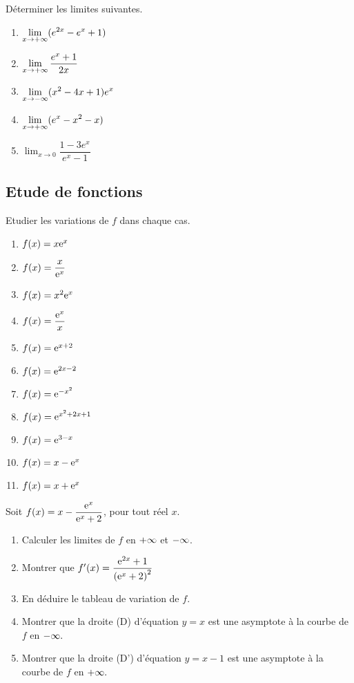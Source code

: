  
 \begin{exercice}
 
 Déterminer les limites suivantes.

 \begin{enumerate}
 \item   $ \displaystyle\lim_{x \to +\infty} (e^{2x}-e^{x} +1) $ \item   $\displaystyle \lim_{x \to +\infty} \dfrac{e^{x}+1}{2x} $  \item  $ \displaystyle\lim_{x \to -\infty}( x^{2}-4x +1)e^{x} $  \item  $\displaystyle \lim_{x \to +\infty}(e^{x}  -x^{2}-x) $ \item  $\displaystyle \lim_{x \to 0} \dfrac{1-3e^{x}}{e^{x}-1} $
 \end{enumerate}

 \end{exercice}
  \subsection*{Etude de fonctions}
  \begin{exercice}

 Etudier les variations de $ f $  dans chaque cas.
 
\begin{enumerate}
\item $ f(x)=x\mathrm{e}^{x} $ 
\item $ f(x)=\dfrac{x}{\mathrm{e}^{x}} $
\item $ f(x)=x^{2}\mathrm{e}^{x}$   
\item $f(x)= \dfrac{\mathrm{e}^{x}}{x} $  
\item $f(x)= \mathrm{e}^{x+2}$ 
\item $f(x)= \mathrm{e}^{2x-2} $   
\item  $f(x)=  \mathrm{e}^{-x^{2}} $
\item  $f(x)=  \mathrm{e}^{x^{2}+2x+1} $   
 \item $ f(x)= \mathrm{e}^{3-x}$ 
  \item $ f(x)= x-\mathrm{e}^{x}$ 
  \item $ f(x)= x+\mathrm{e}^{x}$ 
\end{enumerate}

 \end{exercice}
 
 \begin{exercice}
  Soit $ f(x)=x-\dfrac{\mathrm{e}^{x}}{\mathrm{e}^{x}+2} $,\; pour tout réel $ x. $
  \begin{enumerate}
  \item Calculer  les limites de $ f $  en $+\infty $ et $ -\infty$.
  \item Montrer que $ f^{\prime} (x)=\dfrac{\mathrm{e}^{2x}+1}{\left(\mathrm{e}^{x}+2\right)^{2}}$
  \item En déduire le tableau de variation de $ f. $
  \item Montrer que la droite (D) d'équation \; $ y=x $  est une asymptote à la courbe de $ f $ en $ -\infty. $
  \item Montrer que la droite (D') d'équation \; $ y=x-1$  est une asymptote à la courbe de $ f $ en $ +\infty. $
  \end{enumerate}
 \end{exercice}
 
